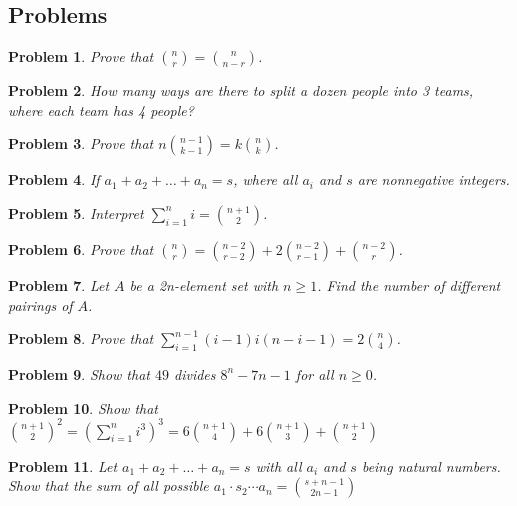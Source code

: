 \documentclass[11pt,a5paper]{article}
\newtheorem{problem}{Problem}
\begin{document}
\subsection*{Problems}

\begin{problem}
Prove that ${n \choose r} = {n \choose n - r}$.
\end{problem}

\begin{problem}
How many ways are there to split a dozen people into 3 teams, where each team has 4 people?
\end{problem}

\begin{problem}
Prove that $n{n-1 \choose k-1}= k{n \choose k}$.
\end{problem}

\begin{problem}
If $a_1 + a_2 + \dots + a_n = s$, where all $a_i$ and $s$ are nonnegative integers.
\end{problem}

\begin{problem}
Interpret $\sum_{i=1}^{n} i = {n+1 \choose 2}$.
\end{problem}

\begin{problem}
Prove that ${n \choose r} = {n - 2 \choose r - 2} + 2{n - 2 \choose r - 1} + {n - 2 \choose r}$.
\end{problem}

\begin{problem}
Let $A$ be a \textit{2n}-element set with $n \ge 1$. Find the number of different pairings of $A$.
\end{problem}

\begin{problem}
Prove that $\sum_{i=1}^{n-1} (i - 1)i(n-i-1) = 2{n \choose 4}$.
\end{problem}

\begin{problem}
Show that $49$ divides $8^n - 7n - 1$ for all $n \ge 0$.
\end{problem}

\begin{problem}
Show that ${n+1 \choose 2}^2 = (\sum_{i=1}^n i^3)^3 = 6{n+1 \choose 4} + 6{n+1 \choose 3} + {n+1 \choose 2}$
\end{problem}

\begin{problem}
Let $a_1 + a_2 + \dots + a_n = s$ with all $a_i$ and $s$ being natural numbers. Show that the sum of all possible $a_1 \cdot s_2 \cdots a_n = {s + n - 1 \choose 2n - 1}$
\end{problem}
\end{document}
